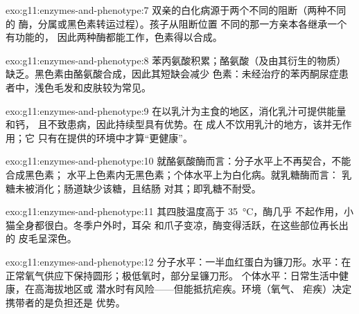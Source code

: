 \begin{solution}{exo:g11:enzymes-and-phenotype:7}
双亲的白化病源于两个不同的阻断（两种不同的
酶，分属或黑色素转运过程）。孩子从阻断位置
不同的那一方亲本各继承一个有功能的，
因此两种酶都能工作，色素得以合成。
\end{solution}

\begin{solution}{exo:g11:enzymes-and-phenotype:8}
苯丙氨酸积累；酪氨酸（及由其衍生的物质）
缺乏。黑色素由酪氨酸合成，因此其短缺会减少
色素：未经治疗的苯丙酮尿症患者中，浅色毛发和皮肤较为常见。
\end{solution}

\begin{solution}{exo:g11:enzymes-and-phenotype:9}
在以乳汁为主食的地区，消化乳汁可提供能量和钙，
且不致患病，因此持续型具有优势。在
成人不饮用乳汁的地方，该并无作用；它
只有在提供的环境中才算“更健康”。
\end{solution}

\begin{solution}{exo:g11:enzymes-and-phenotype:10}
就酪氨酸酶而言：分子水平上不再契合，不能合成黑色素；
水平上色素内无黑色素；个体水平上为白化病。就乳糖酶而言：
乳糖未被消化；肠道缺少该糖，且结肠
对其；即乳糖不耐受。
\end{solution}

\begin{solution}{exo:g11:enzymes-and-phenotype:11}
其四肢温度高于 \qty{35}{\celsius}，酶几乎
不起作用，小猫全身都很白。冬季户外时，耳朵
和爪子变凉，酶变得活跃，在这些部位再长出的
皮毛呈深色。
\end{solution}

\begin{solution}{exo:g11:enzymes-and-phenotype:12}
分子水平：一半血红蛋白为镰刀形。水平：在
正常氧气供应下保持圆形；极低氧时，部分呈镰刀形。
个体水平：日常生活中健康，在高海拔地区或
潜水时有风险——但能抵抗疟疾。环境（氧气、
疟疾）决定携带者的是负担还是
优势。
\end{solution}


